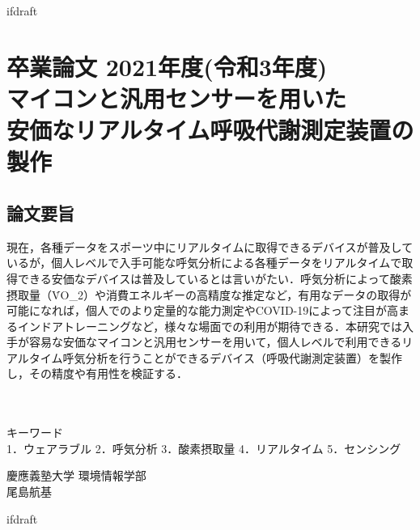 \expandafter\ifx\csname ifdraft\endcsname\relax
 
\fi

\section*{卒業論文 2021年度(令和3年度)\\マイコンと汎用センサーを用いた\\安価なリアルタイム呼吸代謝測定装置の製作}
\subsection*{論文要旨}
\noindent %

現在，各種データをスポーツ中にリアルタイムに取得できるデバイスが普及しているが，個人レベルで入手可能な呼気分析による各種データをリアルタイムで取得できる安価なデバイスは普及しているとは言いがたい．呼気分析によって酸素摂取量（\.{V}O_2）や消費エネルギーの高精度な推定など，有用なデータの取得が可能になれば，個人でのより定量的な能力測定やCOVID-19によって注目が高まるインドアトレーニングなど，様々な場面での利用が期待できる．本研究では入手が容易な安価なマイコンと汎用センサーを用いて，個人レベルで利用できるリアルタイム呼気分析を行うことができるデバイス（呼吸代謝測定装置）を製作し，その精度や有用性を検証する．

\\
\\
キーワード\\
1．ウェアラブル 2．呼気分析 3．酸素摂取量 4．リアルタイム 5．センシング\\
\begin{flushright} %
  慶應義塾大学 環境情報学部\\
  尾島航基
\end{flushright}

\expandafter\ifx\csname ifdraft\endcsname\relax
  
\fi
